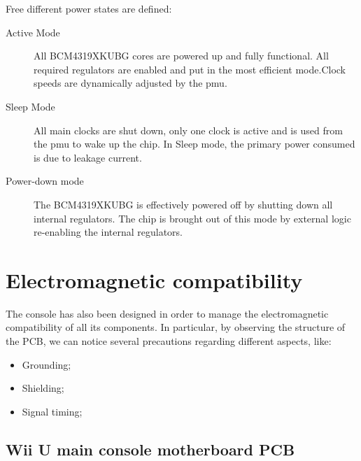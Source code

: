 \documentclass[11pt,a4paper,titlepage]{article}
\begin{document}
						Free different power states are defined:
						\begin{description}
							\item [Active Mode] All BCM4319XKUBG cores are powered up and fully functional. All required regulators are enabled and put in the most efficient mode.Clock speeds are dynamically adjusted by the \gls{pmu}.
							\item [Sleep Mode] All main clocks are shut down, only one clock is active and is used from the \gls{pmu} to wake up the chip. In Sleep mode, the primary power consumed is due to leakage current.
							\item	[Power-down mode] The BCM4319XKUBG is effectively powered off by shutting down all internal regulators. The chip is brought out of this mode by external logic re-enabling the internal regulators.

						\end{description}

\section{Electromagnetic compatibility}
  The console has also been designed in order to manage the electromagnetic compatibility of all its components. In particular, by observing the structure of the PCB, we can notice several precautions regarding different aspects, like:
  \begin{itemize}
    \item Grounding;
    \item Shielding;
    \item Signal timing;
  \end{itemize}

  \subsection{Wii U main console motherboard PCB}
\end{document}

